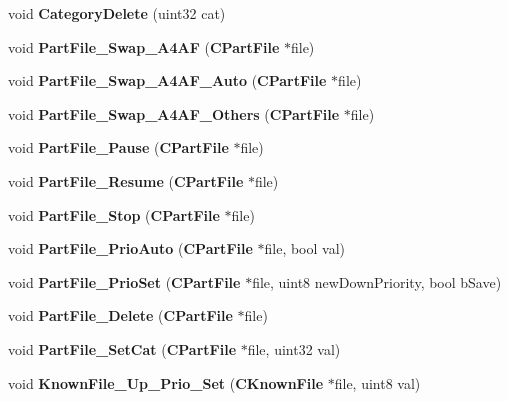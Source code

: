 \begin{DoxyCompactItemize}
\item 
void {\bfseries CategoryDelete} (uint32 cat)\label{namespaceMuleNotify_aa741cf9959b8ba71425232a801ea8a67}

\item 
void {\bfseries PartFile\_\-Swap\_\-A4AF} ({\bf CPartFile} $\ast$file)\label{namespaceMuleNotify_aba2c44f1b0c641258cc57b457132cd3a}

\item 
void {\bfseries PartFile\_\-Swap\_\-A4AF\_\-Auto} ({\bf CPartFile} $\ast$file)\label{namespaceMuleNotify_a4ca90607ef0c5ad13fdbddd03ed2370a}

\item 
void {\bfseries PartFile\_\-Swap\_\-A4AF\_\-Others} ({\bf CPartFile} $\ast$file)\label{namespaceMuleNotify_a6a9546307fb60dcd09f83d074d90ac7f}

\item 
void {\bfseries PartFile\_\-Pause} ({\bf CPartFile} $\ast$file)\label{namespaceMuleNotify_a877bf3818076f141ad71f52e95720be5}

\item 
void {\bfseries PartFile\_\-Resume} ({\bf CPartFile} $\ast$file)\label{namespaceMuleNotify_a35ac691e5c55c9e0013772052c9229e2}

\item 
void {\bfseries PartFile\_\-Stop} ({\bf CPartFile} $\ast$file)\label{namespaceMuleNotify_a936065e75aa329171bb775460653a368}

\item 
void {\bfseries PartFile\_\-PrioAuto} ({\bf CPartFile} $\ast$file, bool val)\label{namespaceMuleNotify_ac4d8c5ac8a224e24af57cad446c82fd0}

\item 
void {\bfseries PartFile\_\-PrioSet} ({\bf CPartFile} $\ast$file, uint8 newDownPriority, bool bSave)\label{namespaceMuleNotify_a52fc30f7feb199dc8e0312e58ff54e71}

\item 
void {\bfseries PartFile\_\-Delete} ({\bf CPartFile} $\ast$file)\label{namespaceMuleNotify_a4244bdf530bf30894d5b5fa5482aa23d}

\item 
void {\bfseries PartFile\_\-SetCat} ({\bf CPartFile} $\ast$file, uint32 val)\label{namespaceMuleNotify_a7aab7e67a1ed7f486e316fac05ca0ef1}

\item 
void {\bfseries KnownFile\_\-Up\_\-Prio\_\-Set} ({\bf CKnownFile} $\ast$file, uint8 val)\label{namespaceMuleNotify_ae56ad9d8f1e4e2b4cdc37fec92bda496}


\end{DoxyCompactItemize}
